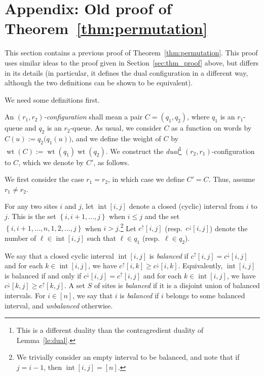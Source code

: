 \documentclass[reqno]{amsart}
\newcommand{\0}{\phantom{c}}
\DeclareMathOperator{\inter}{int} %
\DeclareMathOperator{\wt}{wt} %
\newenvironment{verlong}{}{}
\newcommand{\set}[1]{\left\{ #1 \right\}}
\newcommand{\ive}[1]{\left[ #1 \right]}
\newcommand{\defn}[1]{{\color{darkred}\emph{#1}}} %
\theoremstyle{plain}
\theoremstyle{definition}
\numberwithin{equation}{section}
\begin{document}
\begin{verlong}
\section{Appendix: Old proof of Theorem~\ref{thm:permutation}}
\label{sec:thm_proof-old6}

This section contains a previous proof of Theorem~\ref{thm:permutation}.
This proof uses similar ideas to the proof given in Section~\ref{sec:thm_proof} above,
but differs in its details (in particular, it defines the dual configuration
in a different way, although the two definitions can be shown to be equivalent).

We need some definitions first.

An \defn{$(r_1,r_2)$-configuration} shall mean a pair $C = (q_1, q_2)$, where $q_1$ is an $r_1$-queue and $q_2$ is an $r_2$-queue.
As usual, we consider $C$ as a function on words by $C(u) := q_2\bigl(q_1(u)\bigr)$, and we define the weight of $C$ by $\wt(C) := \wt(q_1) \wt(q_2)$.
We construct the \defn{dual}\footnote{This is a different duality than the contragredient duality of Lemma~\ref{le:dual}.} $(r_2,r_1)$-configuration to $C$, which we denote by $C'$, as follows.

We first consider the case $r_1 = r_2$, in which case we define $C' = C$.
Thus, assume $r_1 \neq r_2$.

For any two sites $i$ and $j$, let $\inter[i,j]$ denote a closed (cyclic) interval from $i$ to $j$.
This is the set $\set{i, i+1, \ldots, j}$ when $i \leq j$ and the set $\set{i, i+1, \ldots, n, 1, 2, \ldots, j}$ when $i > j$.\footnote{We trivially consider an empty interval to be balanced, and note that if $j = i-1$, then $\inter[i,j] = \ive{n}$.}
Let $c^{\uparrow}[i,j]$ (resp.~$c^{\downarrow}[i,j]$) denote the number of $\ell \in \inter[i,j]$ such that $\ell \in q_1$ (resp.~$\ell \in q_2$).

We say that a closed cyclic interval $\inter[i,j]$ is \defn{balanced} if $c^{\uparrow}[i,j] = c^{\downarrow}[i,j]$ and for each $k \in \inter[i,j]$, we have $c^\uparrow[i,k] \geq c^\downarrow[i,k]$.
Equivalently, $\inter[i,j]$ is balanced if and only if $c^{\downarrow}[i,j] = c^{\uparrow}[i,j]$ and for each $k \in \inter[i,j]$, we have $c^\downarrow[k,j] \geq c^\uparrow[k,j]$.
A set $S$ of sites is \defn{balanced} if it is a disjoint union of balanced intervals.
For $i \in \ive{n}$, we say that $i$ is \defn{balanced} if $i$ belongs to some balanced interval, and \defn{unbalanced} otherwise.


\end{verlong}
\end{document}
